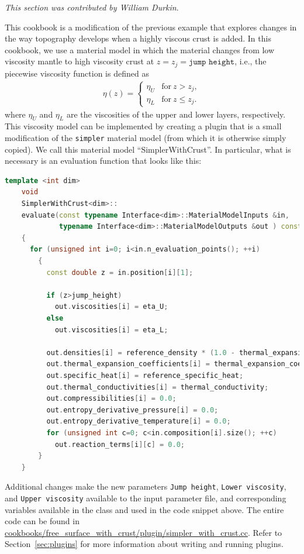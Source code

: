 \textit{This section was contributed by William Durkin}.

This cookbook is a modification of the previous example that explores changes in the way topography develops when a 
highly viscous crust is added.  
In this cookbook, we use a material model in which the material changes from low
viscosity mantle to high viscosity crust at $z = z_j = \texttt{jump height}$,
i.e., the piecewise viscosity function is defined as
\begin{align*}
  \eta(z) = \left\{
    \begin{matrix}
      \eta_U & \text{for}\ z > z_j, \\
      \eta_L & \text{for}\ z  \le z_j.
    \end{matrix}
  \right.
\end{align*}
where $\eta_U$ and $\eta_L$ are the viscosities of the upper and lower layers,
respectively. This viscosity model can be implemented by creating a plugin that
is a small modification of the \texttt{simpler} material model (from which it
is otherwise simply copied). We call this material model ``SimplerWithCrust''.
In particular, what is necessary is an evaluation function that looks like this:
\begin{lstlisting}[frame=single,language=C++] 
    template <int dim>
    void
    SimplerWithCrust<dim>::
    evaluate(const typename Interface<dim>::MaterialModelInputs &in, 
             typename Interface<dim>::MaterialModelOutputs &out ) const
    {
      for (unsigned int i=0; i<in.n_evaluation_points(); ++i)
        {
          const double z = in.position[i][1];

          if (z>jump_height)
            out.viscosities[i] = eta_U;
          else
            out.viscosities[i] = eta_L;

          out.densities[i] = reference_density * (1.0 - thermal_expansion_coefficient * (in.temperature[i] - reference_temperature));
          out.thermal_expansion_coefficients[i] = thermal_expansion_coefficient;
          out.specific_heat[i] = reference_specific_heat;
          out.thermal_conductivities[i] = thermal_conductivity;
          out.compressibilities[i] = 0.0;
          out.entropy_derivative_pressure[i] = 0.0;
          out.entropy_derivative_temperature[i] = 0.0;
          for (unsigned int c=0; c<in.composition[i].size(); ++c)
            out.reaction_terms[i][c] = 0.0;
        }
    }
\end{lstlisting}

Additional changes make the new parameters \texttt{Jump height}, \texttt{Lower
viscosity}, and \texttt{Upper viscosity} available to the input parameter file,
and corresponding variables available in the class and used in the code snippet
above. The entire code can be found in
\url{cookbooks/free_surface_with_crust/plugin/simpler_with_crust.cc}. Refer to
Section~\ref{sec:plugins} for more information about writing and running
plugins.

